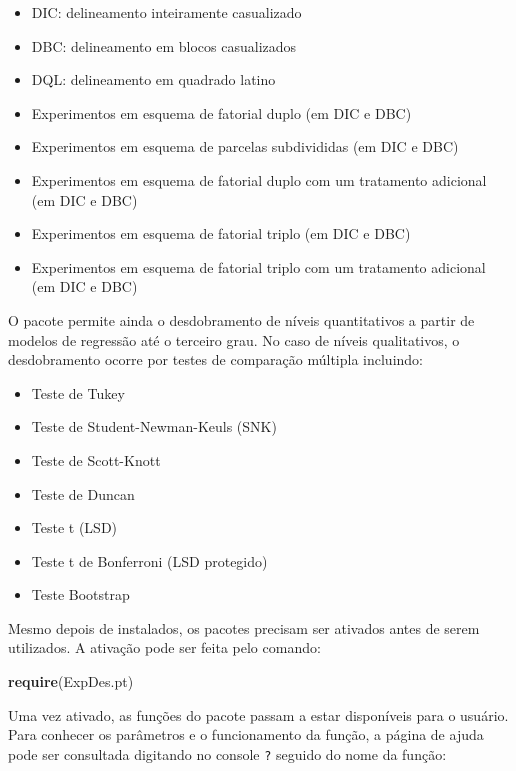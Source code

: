 \documentclass[
]{article}
\newenvironment{Shaded}{\begin{snugshade}}{\end{snugshade}}
\newcommand{\KeywordTok}[1]{\textcolor[rgb]{0.13,0.29,0.53}{\textbf{#1}}}
\newcommand{\NormalTok}[1]{#1}
\providecommand{\tightlist}{%
  \setlength{\itemsep}{0pt}\setlength{\parskip}{0pt}}
\begin{document}
\begin{itemize}
\tightlist
\item
  DIC: delineamento inteiramente casualizado
\item
  DBC: delineamento em blocos casualizados
\item
  DQL: delineamento em quadrado latino
\item
  Experimentos em esquema de fatorial duplo (em DIC e DBC)
\item
  Experimentos em esquema de parcelas subdivididas (em DIC e DBC)
\item
  Experimentos em esquema de fatorial duplo com um tratamento adicional (em DIC e DBC)
\item
  Experimentos em esquema de fatorial triplo (em DIC e DBC)
\item
  Experimentos em esquema de fatorial triplo com um tratamento adicional (em DIC e DBC)
\end{itemize}

O pacote permite ainda o desdobramento de níveis quantitativos a partir de modelos de regressão até o terceiro grau. No caso de níveis qualitativos, o desdobramento ocorre por testes de comparação múltipla incluindo:

\begin{itemize}
\tightlist
\item
  Teste de Tukey
\item
  Teste de Student-Newman-Keuls (SNK)
\item
  Teste de Scott-Knott
\item
  Teste de Duncan
\item
  Teste t (LSD)
\item
  Teste t de Bonferroni (LSD protegido)
\item
  Teste Bootstrap
\end{itemize}

Mesmo depois de instalados, os pacotes precisam ser ativados antes de serem utilizados. A ativação pode ser feita pelo comando:

\begin{Shaded}
\begin{Highlighting}[]
\KeywordTok{require}\NormalTok{(ExpDes.pt)}
\end{Highlighting}
\end{Shaded}

Uma vez ativado, as funções do pacote passam a estar disponíveis para o usuário. Para conhecer os parâmetros e o funcionamento da função, a página de ajuda pode ser consultada digitando no console \texttt{?} seguido do nome da função:
\end{document}
